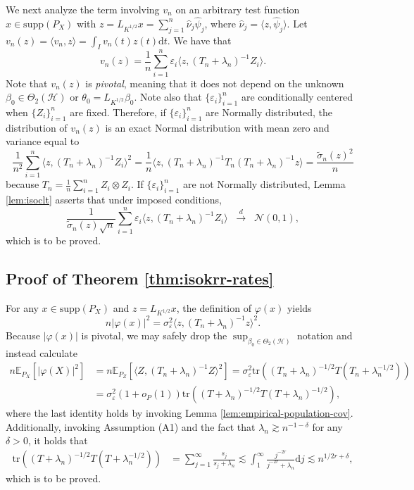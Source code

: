 \documentclass[11pt,a4paper]{article}
\renewcommand{\hat}{\widehat}
\renewcommand{\tilde}{\widetilde}
\newcommand{\tr}{\mathrm{tr}}
\theoremstyle{definition}
\theoremstyle{plain}
\theoremstyle{remark}
\newcommand{\supp}{\mathrm{supp}}
\newcommand{\ud}{\mathrm d}
\newcommand{\mH}{\mathcal H}
\begin{document}
We next analyze the term involving $v_n$ on an arbitrary test function $x\in\supp(P_X)$ with $z=L_{K^{1/2}}x=\sum_{j=1}^n\hat\nu_j\hat\psi_j$, where $\hat\nu_j=\langle z,\hat\psi_j\rangle$.
Let $v_n(z)=\langle v_n,z\rangle = \int_I v_n(t)z(t)\ud t$. We have that
$$
v_n(z) = \frac{1}{n}\sum_{i=1}^n \varepsilon_i \langle z, (T_n+\lambda_n)^{-1}Z_i\rangle.
$$
Note that $v_n(z)$ is \emph{pivotal}, meaning that it does not depend on the unknown $\beta_0\in\Theta_2(\mH)$ or $\theta_0=L_{K^{1/2}}\beta_0$.
Note also that $\{\varepsilon_i\}_{i=1}^n$ are conditionally centered when $\{Z_i\}_{i=1}^n$ are fixed. Therefore, if $\{\varepsilon_i\}_{i=1}^n$ are Normally distributed,
the distribution of $v_n(z)$ is an exact Normal distribution with mean zero and variance equal to
$$
\frac{1}{n^2}\sum_{i=1}^n \langle z,(T_n+\lambda_n)^{-1}Z_i\rangle^2 = \frac{1}{n}\langle z, (T_n+\lambda_n)^{-1}T_n(T_n+\lambda_n)^{-1}z\rangle = \frac{\tilde\sigma_n(z)^2}{n}
$$
because $T_n=\frac{1}{n}\sum_{i=1}^n Z_i\otimes Z_i$. If $\{\varepsilon_i\}_{i=1}^n$ are not Normally distributed, Lemma \ref{lem:isoclt} asserts that under imposed conditions,
$$
\frac{1}{\tilde\sigma_n(z)\sqrt{n}}\sum_{i=1}^n\varepsilon_i\langle z,(T_n+\lambda_n)^{-1}Z_i\rangle\;\;\overset{d}{\to}\;\; \mathcal N(0,1),
$$
which is to be proved.

\subsection{Proof of Theorem \ref{thm:isokrr-rates}}

For any $x\in\supp(P_X)$ and $z=L_{K^{1/2}}x$, the definition of $\varphi(x)$ yields
$$
n\big|\varphi(x)\big|^2 = \sigma_\varepsilon^2\langle z, (T_n+\lambda_n)^{-1}z\rangle^2.
$$
Because $|\varphi(x)|$ is pivotal, we may safely drop the $\sup_{\beta_0\in\Theta_2(\mH)}$ notation and instead calculate
\begin{align*}
n\mathbb E_{P_X}\left[|\varphi(X)|^2\right] &= n\mathbb E_{P_Z}[\langle Z,(T_n+\lambda_n)^{-1}Z\rangle^2] = \sigma_\varepsilon^2\tr((T_n+\lambda_n)^{-1/2}T(T_n+\lambda_n^{-1/2}))\\
&= \sigma_\varepsilon^2(1+o_P(1))\tr((T+\lambda_n)^{-1/2}T(T+\lambda_n)^{-1/2}),
\end{align*}
where the last identity holds by invoking Lemma \ref{lem:empirical-population-cov}. Additionally, invoking Assumption (A1) and the fact that $\lambda_n\gtrsim n^{-1-\delta}$ for any $\delta>0$, it holds that
\begin{align*}
\tr((T+\lambda_n)^{-1/2}T(T+\lambda_n^{-1/2})) &= \sum_{j=1}^{\infty} \frac{s_j}{s_j+\lambda_n} \lesssim \int_1^{\infty}\frac{j^{-2r}}{j^{-2r}+\lambda_n}\ud j\lesssim n^{1/2r+\delta},
\end{align*}
which is to be proved.
\end{document}
